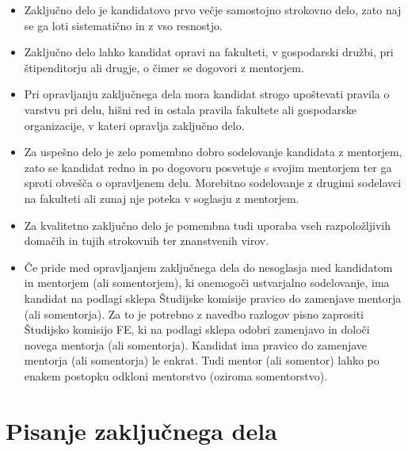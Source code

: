 \documentclass[a4paper,twoside,openright,12pt,slovene]{book}
\begin{document}
\begin{itemize}

\item Zaključno delo je kandidatovo prvo večje samostojno strokovno delo, zato naj se ga loti sistematično in z vso resnostjo.

\item Zaključno delo lahko kandidat opravi na fakulteti, v gospodarski družbi, pri štipenditorju ali drugje, o čimer se dogovori z mentorjem.

\item Pri opravljanju zaključnega dela mora kandidat strogo upoštevati pravila o varstvu pri delu, hišni red in ostala pravila fakultete ali gospodarske organizacije, v kateri opravlja zaključno delo.

\item Za uspešno delo je zelo pomembno dobro sodelovanje kandidata z mentorjem, zato se kandidat redno in po dogovoru posvetuje s svojim mentorjem ter ga sproti obvešča o opravljenem delu. Morebitno sodelovanje z drugimi sodelavci na fakulteti ali zunaj nje poteka v soglasju z mentorjem.

\item Za kvalitetno zaključno delo je pomembna tudi uporaba vseh razpoložljivih domačih in tujih strokovnih ter znanstvenih virov.

\item Če pride med opravljanjem zaključnega dela do nesoglasja med kandidatom in mentorjem (ali somentorjem), ki onemogoči ustvarjalno sodelovanje, ima kandidat na podlagi sklepa Študijske komisije pravico do zamenjave mentorja (ali somentorja). Za to je potrebno z navedbo razlogov pisno zaprositi Študijsko komisijo FE, ki na podlagi sklepa odobri zamenjavo in določi novega mentorja (ali somentorja). Kandidat ima pravico do zamenjave mentorja (ali somentorja) le enkrat. Tudi mentor (ali somentor) lahko po enakem postopku odkloni mentorstvo (oziroma somentorstvo).

\end{itemize}

\chapter{Pisanje zaključnega dela} \label{pisanje_dela}
\end{document}
